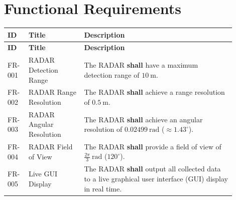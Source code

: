 \documentclass[12pt, a4paper]{article}
\begin{document}
	
	\section{Functional Requirements}
	\label{sec:func}
	
	\renewcommand{\arraystretch}{1.4}
	\begin{longtable}{|>{\ttfamily}p{0.08\linewidth}|p{0.22\linewidth}|p{0.60\linewidth}|}
		\hline
		\textbf{ID} & \textbf{Title} & \textbf{Description} \\
		\hline
		\endfirsthead
		
		\hline
		\textbf{ID} & \textbf{Title} & \textbf{Description} \\
		\hline
		\endhead
		
		\hline
		\endfoot
		
		FR-001 &
		RADAR Detection Range &
		The RADAR \textbf{shall} have a maximum detection range of $10\ \text{m}$. \\
		\hline
		
		FR-002 &
		RADAR Range Resolution &
		The RADAR \textbf{shall} achieve a range resolution of $0.5\ \text{m}$. \\
		\hline
		
		FR-003 &
		RADAR Angular Resolution &
		The RADAR \textbf{shall} achieve an angular resolution of $0.02499\ \text{rad}$ ($\approx 1.43^{\circ}$). \\
		\hline
		
		FR-004 &
		RADAR Field of View &
		The RADAR \textbf{shall} provide a field of view of $\frac{2\pi}{3}\ \text{rad}$ ($120^{\circ}$). \\
		\hline
		
		FR-005 &
		Live GUI Display &
		The RADAR \textbf{shall} output all collected data to a live graphical user interface (GUI) display in real time. \\
		\hline
		
	\end{longtable}
	
\end{document}
